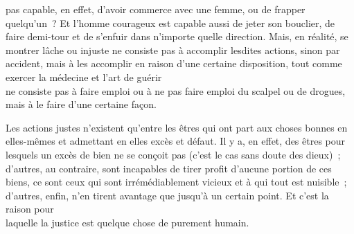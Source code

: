 \documentclass[french,twoside]{book} %
\begin{document}
pas capable, en effet, d’avoir commerce avec une femme, ou de frapper quelqu’un ? Et l’homme courageux est capable aussi de jeter son bouclier, de faire demi-tour et de s’enfuir dans n’importe quelle direction. Mais, en réalité, se montrer lâche ou injuste ne consiste pas à accomplir lesdites actions, sinon par accident, mais à les accomplir en raison d’une certaine disposition, tout comme exercer la médecine et l’art de guérir \\
ne consiste pas à faire emploi ou à ne pas faire emploi du scalpel ou de drogues, mais à le faire d’une certaine façon.\par
Les actions justes n’existent qu’entre les êtres qui ont part aux choses bonnes en elles-mêmes et admettant en elles excès et défaut. Il y a, en effet, des êtres pour lesquels un excès de bien ne se conçoit pas (c’est le cas sans doute des dieux) ; d’autres, au contraire, sont incapables de tirer profit d’aucune portion de ces biens, ce sont ceux qui sont irrémédiablement vicieux et à qui tout est nuisible ; d’autres, enfin, n’en tirent avantage que jusqu’à un certain point. Et c’est la raison pour \\
laquelle la justice est quelque chose de purement humain.
\end{document}
